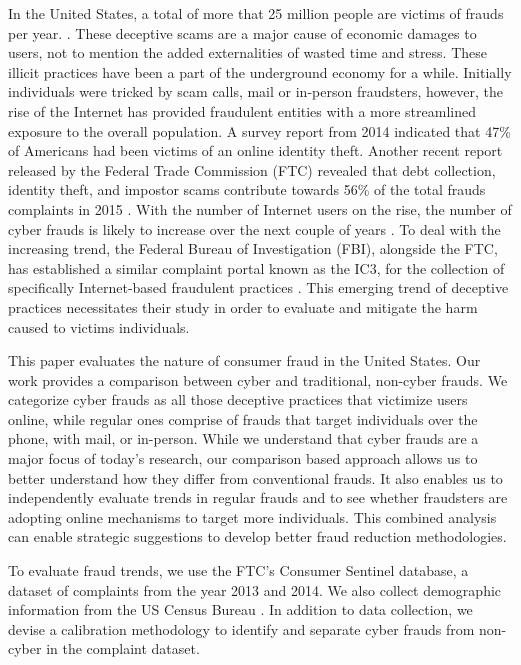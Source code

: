 \documentclass[conference]{IEEEtran}
\begin{document}
In the United States, a total of more that 25 million people are victims of frauds per year. \cite{anderson2013consumer}. These deceptive scams are a major cause of economic damages to users, not to mention the added externalities of wasted time and stress. These illicit practices have been a part of the underground economy for a while. Initially individuals were tricked by scam calls, mail or in-person fraudsters, however, the rise of the Internet has provided fraudulent entities with a more streamlined exposure to the overall population. A  survey report from 2014 indicated that 47\% of Americans had been victims of an online identity theft. Another recent report released by the  Federal Trade Commission (FTC) revealed that debt collection, identity theft, and impostor scams contribute towards 56\% of the total frauds complaints in 2015 \cite{ftcpress2016} . With the number of Internet users on the rise, the number of cyber frauds is likely to increase over the next couple of years \cite{perharassment}. To deal with the increasing trend, the Federal Bureau of Investigation (FBI), alongside the FTC, has established a similar complaint portal known as the IC3, for the collection of specifically Internet-based fraudulent practices \cite{fbiic3}. This emerging trend of deceptive practices necessitates their study in order to evaluate and mitigate the harm caused to victims individuals.

This paper evaluates the nature of consumer fraud in the United States. Our work provides a comparison between cyber and traditional, non-cyber frauds. We categorize cyber frauds as all those deceptive practices that victimize users online, while regular ones comprise of frauds that target individuals over the phone, with mail, or in-person. While we understand that cyber frauds are a major focus of today's research, our comparison based approach allows us to better understand how they differ from conventional frauds. It also enables us to independently evaluate trends in regular frauds and to see whether fraudsters are adopting online mechanisms to target more individuals. This combined analysis can enable strategic suggestions to develop better fraud reduction methodologies.

To evaluate fraud trends, we use the FTC's Consumer Sentinel database, a dataset of complaints from the year 2013 and 2014. We also collect demographic information from the US Census Bureau \cite{uscensus}. In addition to data collection, we devise a calibration methodology to identify and separate cyber frauds from non-cyber in the complaint dataset. 
\end{document}
